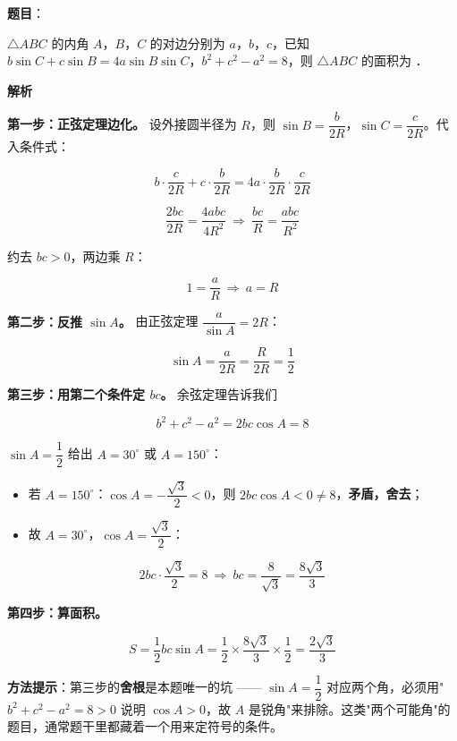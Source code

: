 \begin{answer}

\textbf{题目}：

$\triangle ABC$ 的内角 $A$，$B$，$C$ 的对边分别为 $a$，$b$，$c$，已知 $b\sin C+c\sin B=4a\sin B\sin C$，$b^{2}+c^{2}-a^{2}=8$，则 $\triangle ABC$ 的面积为 \gkblank{}．

\textbf{解析}

\textbf{第一步：正弦定理边化。} 设外接圆半径为 $R$，则 $\sin B=\dfrac b{2R}$，$\sin C=\dfrac c{2R}$。代入条件式：

\nopagebreak[4]
\[b\cdot\frac c{2R}+c\cdot\frac b{2R}=4a\cdot\frac b{2R}\cdot\frac c{2R}\]

\nopagebreak[4]
\[\frac{2bc}{2R}=\frac{4abc}{4R^{2}}\ \Longrightarrow\ \frac{bc}R=\frac{abc}{R^{2}}\]

约去 $bc>0$，两边乘 $R$：

\nopagebreak[4]
\[1=\frac aR\ \Longrightarrow\ a=R\]

\textbf{第二步：反推 $\sin A$。} 由正弦定理 $\dfrac a{\sin A}=2R$：

\nopagebreak[4]
\[\sin A=\frac a{2R}=\frac R{2R}=\frac12\]

\textbf{第三步：用第二个条件定 $bc$。} 余弦定理告诉我们

\nopagebreak[4]
\[b^{2}+c^{2}-a^{2}=2bc\cos A=8\]

$\sin A=\dfrac12$ 给出 $A=30^\circ$ 或 $A=150^\circ$：

\begin{itemize}
\item 若 $A=150^\circ$：$\cos A=-\dfrac{\sqrt3}2<0$，则 $2bc\cos A<0\ne8$，\textbf{矛盾，舍去}；
\item 故 $A=30^\circ$，$\cos A=\dfrac{\sqrt3}2$：
\end{itemize}
\nopagebreak[4]
\[2bc\cdot\frac{\sqrt3}2=8\ \Longrightarrow\ bc=\frac8{\sqrt3}=\frac{8\sqrt3}3\]

\textbf{第四步：算面积。}

\nopagebreak[4]
\[S=\frac12bc\sin A=\frac12\times\frac{8\sqrt3}3\times\frac12=\frac{2\sqrt3}3\]

\begin{gktip}
\textbf{方法提示}：第三步的\textbf{舍根}是本题唯一的坑 —— $\sin A=\dfrac12$ 对应两个角，必须用"$b^{2}+c^{2}-a^{2}=8>0$ 说明 $\cos A>0$，故 $A$ 是锐角"来排除。这类"两个可能角"的题目，通常题干里都藏着一个用来定符号的条件。
\end{gktip}


\par\medskip

\end{answer}

